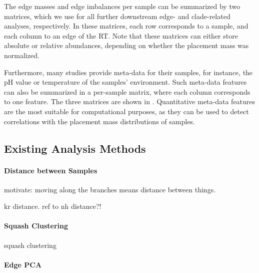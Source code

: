 The edge masses and edge imbalances per sample can be summarized by two matrices,
which we use for all further downstream edge- and clade-related analyses, respectively.
In these matrices, each row corresponds to a sample, and each column to an edge of the \ac{RT}.
Note that these matrices can either store absolute or relative abundances,
depending on whether the placement mass was normalized.

Furthermore, many studies provide meta-data for their samples,
for instance, the pH value or temperature of the samples' environment.
Such meta-data features can also be summarized in a per-sample matrix, where each column corresponds to one feature.
The three matrices are shown in .
Quantitative meta-data features are the most suitable for computational purposes,
as they can be used to detect correlations with the placement mass distributions of samples.


\subsection{Existing Analysis Methods}
\label{ch:Foundations:sec:PhylogeneticPlacement:sub:ExistingMethods}

\paragraph{Distance between Samples}
\label{ch:Foundations:sec:PhylogeneticPlacement:sub:ExistingMethods:par:Distances}

motivate: moving along the branches means distance between things.

kr distance. ref to nh distance?!
\cite{Evans2012}

\paragraph{Squash Clustering}
\label{ch:Foundations:sec:PhylogeneticPlacement:sub:ExistingMethods:par:SquashClustering}

squash clustering
\cite{Matsen2011a,Evans2012}


\paragraph{Edge PCA}
\label{ch:Foundations:sec:PhylogeneticPlacement:sub:ExistingMethods:par:EdgePCA}

